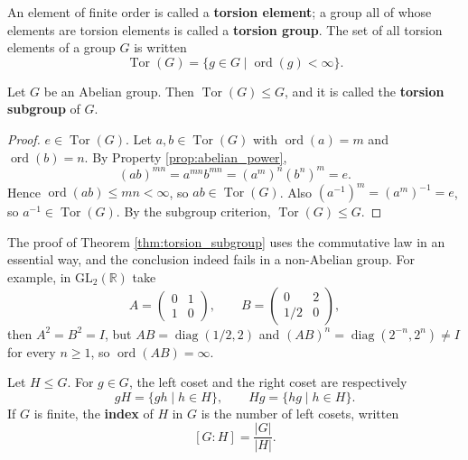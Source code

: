 \begin{definition}\label{def:torsion}
An element of finite order is called a \textbf{torsion element}; a group all of whose elements are torsion elements is called a \textbf{torsion group}. The set of all torsion elements of a group $G$ is written
\[
\operatorname{Tor}(G)=\{g\in G\mid \operatorname{ord}(g)<\infty\}.
\]
\end{definition}

\begin{theorem}\label{thm:torsion_subgroup}
Let $G$ be an Abelian group. Then $\operatorname{Tor}(G)\le G$, and it is called the \textbf{torsion subgroup} of $G$.
\end{theorem}

\begin{proof}
$e\in\operatorname{Tor}(G)$. Let $a,b\in\operatorname{Tor}(G)$ with $\operatorname{ord}(a)=m$ and $\operatorname{ord}(b)=n$. By Property \ref{prop:abelian_power},
\[
(ab)^{mn}=a^{mn}b^{mn}=(a^m)^n(b^n)^m=e.
\]
Hence $\operatorname{ord}(ab)\le mn<\infty$, so $ab\in\operatorname{Tor}(G)$. Also $(a^{-1})^m=(a^m)^{-1}=e$, so $a^{-1}\in\operatorname{Tor}(G)$. By the subgroup criterion, $\operatorname{Tor}(G)\le G$.
\end{proof}

\begin{remark}\label{rem:torsion_nonabelian}
The proof of Theorem \ref{thm:torsion_subgroup} uses the commutative law in an essential way, and the conclusion indeed fails in a non-Abelian group. For example, in $\mathrm{GL}_2(\mathbb{R})$ take
\[
A=\begin{pmatrix}0&1\\1&0\end{pmatrix},\qquad
B=\begin{pmatrix}0&2\\1/2&0\end{pmatrix},
\]
then $A^2=B^2=I$, but $AB=\operatorname{diag}(1/2,2)$ and $(AB)^n=\operatorname{diag}(2^{-n},2^n)\neq I$ for every $n\ge 1$, so $\operatorname{ord}(AB)=\infty$.
\end{remark}

\begin{definition}\label{def:coset_index}
Let $H\le G$. For $g\in G$, the left coset and the right coset are respectively
\[
gH=\{gh\mid h\in H\},\qquad Hg=\{hg\mid h\in H\}.
\]
If $G$ is finite, the \textbf{index} of $H$ in $G$ is the number of left cosets, written
\[
[G:H]=\frac{|G|}{|H|}.
\]
\end{definition}

